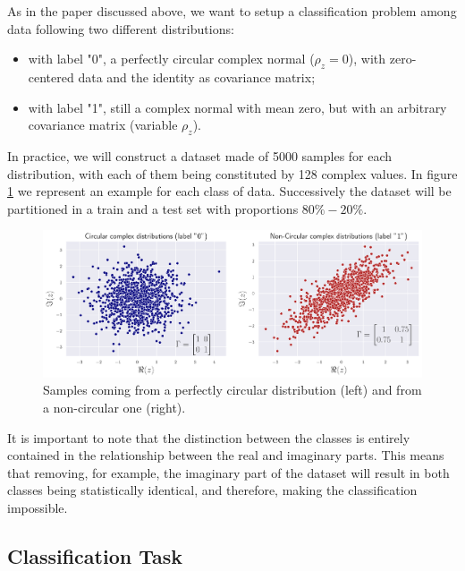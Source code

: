 \documentclass[../main.tex]{subfiles}
\begin{document}
As in the paper discussed above, we want to setup a classification problem among data following two different distributions:
\begin{itemize}
	\item with label "0", a perfectly circular complex normal ($\rho_z=0$), with zero-centered data and the identity as covariance matrix;
	\item with label "1", still a complex normal with mean zero, but with an arbitrary covariance matrix (variable $\rho_z$).
\end{itemize}
In practice, we will construct a dataset made of 5000 samples for each distribution, with each of them being constituted by 128 complex values. In figure \ref{fig:circ_class_example} we represent an example for each class of data. Successively the dataset will be partitioned in a train and a test set with proportions $80\%-20\%$.\\
\begin{figure}[!ht]
	\centering
	\includegraphics[width=\textwidth]{pictures/circ_class_example}
	\caption{Samples coming from a perfectly circular distribution (left) and from a non-circular one (right).}
	\label{fig:circ_class_example}
\end{figure}
It is important to note that the distinction between the classes is entirely contained in the relationship between the real and imaginary parts. This means that removing, for example, the imaginary part of the dataset will result in both classes being statistically identical, and therefore, making the classification impossible.

\subsection*{Classification Task}
\end{document}
